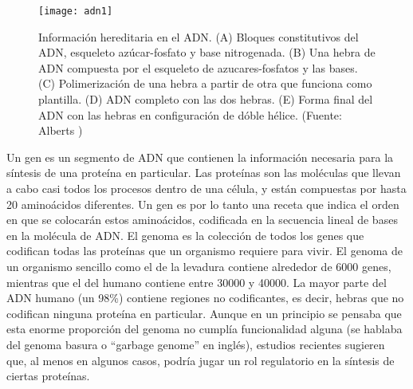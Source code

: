 \begin{figure}[h]
    \centering
    \texttt{[image: adn1]}
    \caption{Información hereditaria en el ADN. (A) Bloques constitutivos del ADN, esqueleto azúcar-fosfato y base nitrogenada. (B) Una hebra de ADN compuesta por el esqueleto de azucares-fosfatos y las bases. (C) Polimerización de una hebra a partir de otra que funciona como plantilla. (D) ADN completo con las dos hebras. (E) Forma final del ADN con las hebras en configuración de dóble hélice. (Fuente: Alberts \cite{Alberts2015})}
    \label{fig:adn1}
\end{figure}
Un gen es un segmento de ADN que contienen la información necesaria para la síntesis de una proteína en particular. Las proteínas son las moléculas que llevan a cabo casi todos los procesos dentro de una célula, y están compuestas por hasta 20 aminoácidos diferentes. Un gen es por lo tanto una receta que indica el orden en que se colocarán estos aminoácidos, codificada en la secuencia lineal de bases en la molécula de ADN. El genoma es la colección de todos los genes que codifican todas las proteínas que un organismo requiere para vivir. El genoma de un organismo sencillo como el de la levadura contiene alrededor de 6000 genes, mientras que el del humano contiene entre 30000 y 40000. La mayor parte del ADN humano (un 98\%) contiene regiones no codificantes, es decir, hebras que no codifican ninguna proteína en particular. Aunque en un principio se pensaba que esta enorme proporción del genoma no cumplía funcionalidad alguna (se hablaba del genoma basura o ``garbage genome'' en inglés), estudios recientes sugieren que, al menos en algunos casos, podría jugar un rol regulatorio en la síntesis de ciertas proteínas.\\\\

